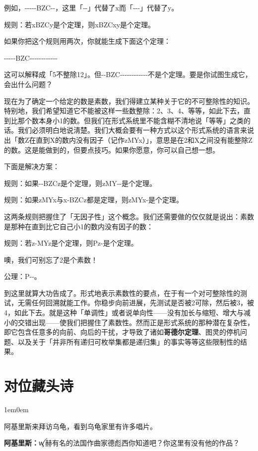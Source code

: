 \documentclass[
  12pt,
  twoside,
  openright,
  oldfontcommands,
]{memoir}
\newcommand{\heititext}[1]{{\heifamily\bfseries #1}}
\newcommand{\dialogname}[1]{{\heifamily\bfseries #1}}
\newenvironment{dialogguide}{%
  \begin{adjustwidth}{1em}{0em}\kaitifamily\itshape\small%
}{%
  \end{adjustwidth}%
}
\begin{document}
例如，-\/-\/-\/-\/-BZC-\/-，这里「-\/-」代替了x而「-\/-\/-」代替了y。

规则：若xBZCy是个定理，则xBZCxy是个定理。

如果你把这个规则用两次，你就能生成下面这个定理：

-\/-\/-\/-\/-BZC-\/-\/-\/-\/-\/-\/-\/-\/-\/-\/-\/-

这可以解释成「5不整除12」。但-\/-BZC-\/-\/-\/-\/-\/-\/-\/-\/-\/-\/-\/-不是个定理。要是你试图生成它，会出什么问题？

现在为了确定一个给定的数是素数，我们得建立某种关于它的不可整除性的知识。特别地，我们希望知道它不能被这样一些数整除：2、3、4、等等，如此下去，直到比那个数本身小1的数。但我们在形式系统里不能含糊不清地说「等等」之类的话。我们必须明白地说淸楚。我们大概会要有一种方式以这个形式系统的语言来说出「数Z在直到X的数内没有因子（记作zMYx）」，意思是在2和X之间没有能整除Z的数。这是能做到的，但要点技巧。如果你愿意，你可以自己想一想。

下面是解决方案：

规则：如果-\/-BZCz是个定理，则zMY-\/-是个定理。

规则：如果zMYx与x-BZCz都是定理，则zMYx-是个定理。

这两条规则把握住了「无因子性」这个概念。我们还需要做的仅仅就是说出：素数是那种在直到比它自己小1的数内没有因子的数：

规则：若z-MYz是个定理，则Pz-是个定理。

噢，我们可别忘了2是个素数！

公理：P-\/-。

到这里就算大功告成了。形式地表示素数性的要点，在于有一个对可整除性的测试，无需任何回溯就能工作。你稳步向前进展，先测试是否被2可除，然后被3，被4，如此下去。就是这种「单调性」或者说单向性------没有加长与缩短、增大与减小的交错出现------使我们把握住了素数性。然而正是形式系统的那种潜在复杂性，即它包含任意多的向前、向后的干扰，才导致了诸如\heititext{哥德尔定理}、图灵的停机问题、以及关于「并非所有递归可枚举集都是递归集」的事实等等这些限制性的结果。

\label{Dialog04.xhtml}{}

\chapter*{对位藏头诗}

\begin{dialogguide}
阿基里斯来拜访乌龟，看到乌龟家里有许多唱片。
\end{dialogguide}

\dialogname{阿基里斯：}{\gebfont ꪟ}赫有名的法国作曲家德彪西你知道吧？你这里有没有他的作品？
\end{document}
